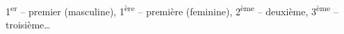 1\textsuperscript{er} -- premier (masculine), 
1\textsuperscript{ère} -- première (feminine),
2\textsuperscript{ème} -- deuxième, 
3\textsuperscript{ème} -- troisième\dots

